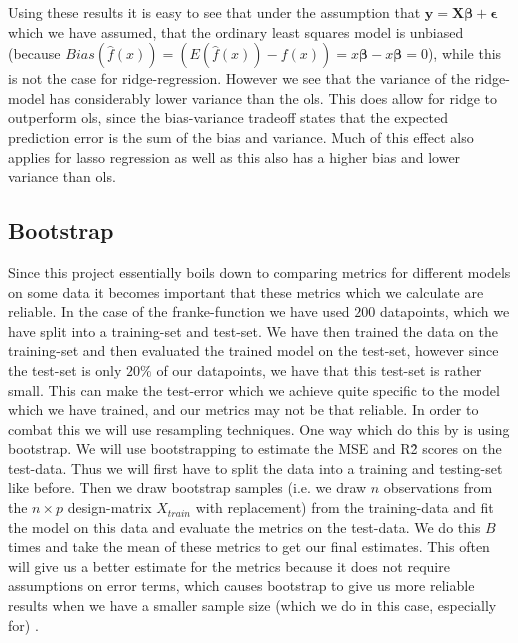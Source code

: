 \documentclass{article}
\begin{document}
Using these results it is easy to see that under the assumption that $\mathbf{y}
    = \mathbf{X}\mathbf{\beta} + \mathbf{\epsilon}$ which we have assumed, that the
ordinary least squares model is unbiased (because $Bias(\hat{f}(x)) =
    (E(\hat{f}(x)) - f(x)) = x \bm{\beta} - x\bm{\beta} = 0$), while this is
not the case for ridge-regression. However we see that the variance of the
ridge-model has considerably lower variance than the ols. This does allow for
ridge to outperform ols, since the bias-variance tradeoff states that the
expected prediction error is the sum of the bias and variance. Much of this
effect also applies for lasso regression as well as this also has a higher bias
and lower variance than ols.

\subsection{Bootstrap}
Since this project essentially boils down to comparing metrics for different
models on some data it becomes important that these metrics which we calculate
are reliable. In the case of the franke-function we have used $200$ datapoints,
which we have split into a training-set and test-set. We have then trained the
data on the training-set and then evaluated the trained model on the test-set,
however since the test-set is only $20\%$ of our datapoints, we have that this
test-set is rather small. This can make the test-error which we achieve quite
specific to the model which we have trained, and our metrics may not be that
reliable. In order to combat this we will use resampling techniques. One way
which do this by is using bootstrap. We will use bootstrapping to estimate the
MSE and R\^2 scores on the test-data. Thus we will first have to split the data
into a training and testing-set like before. Then we draw bootstrap samples
(i.e. we draw $n$ observations from the $n\times p$ design-matrix $X_{train}$
with replacement) from the training-data and fit the model on this data and
evaluate the metrics on the test-data. We do this $B$ times and take the mean of
these metrics to get our final estimates. This often will give us a better
estimate for the metrics because it does not require assumptions on error terms,
which causes bootstrap to give us more reliable results when we have a smaller
sample size (which we do in this case, especially for) \cite[s.~5.3]{lecturenotes5}.
\end{document}
